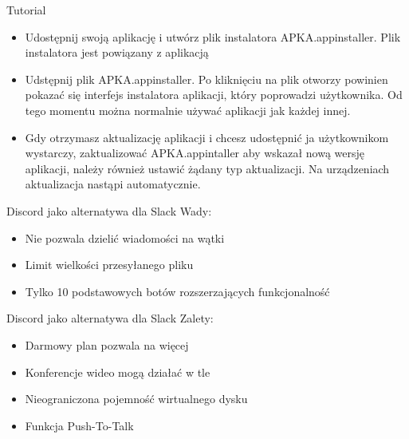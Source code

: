 \documentclass{beamer}
\begin{document}
\begin{frame}{Tutorial}
    \begin{itemize}
        \item Udostępnij swoją aplikację i utwórz plik instalatora APKA.appinstaller. Plik instalatora jest powiązany z aplikacją
        \item Udstępnij plik APKA.appinstaller. Po kliknięciu na plik otworzy powinien pokazać się interfejs instalatora aplikacji, który poprowadzi użytkownika. Od tego momentu można normalnie używać aplikacji jak każdej innej.
        \item  Gdy otrzymasz aktualizację aplikacji i chcesz udostępnić ja użytkownikom wystarczy, zaktualizować APKA.appintaller aby wskazał nową wersję aplikacji, należy również ustawić żądany typ aktualizacji. Na urządzeniach aktualizacja nastąpi automatycznie.
    \end{itemize}
\end{frame}

\begin{frame}{Discord jako alternatywa dla Slack}
    Wady:\\
    \begin{itemize}
        \item Nie pozwala dzielić wiadomości na wątki
        \item Limit wielkości przesyłanego pliku
        \item Tylko 10 podstawowych botów rozszerzających funkcjonalność
    \end{itemize}
\end{frame}
\begin{frame}{Discord jako alternatywa dla Slack}
    Zalety:\\
    \begin{itemize}
        \item Darmowy plan pozwala na więcej
        \item Konferencje wideo mogą działać w tle
        \item Nieograniczona pojemność wirtualnego dysku
        \item Funkcja Push-To-Talk
    \end{itemize}
\end{frame}
\end{document}
